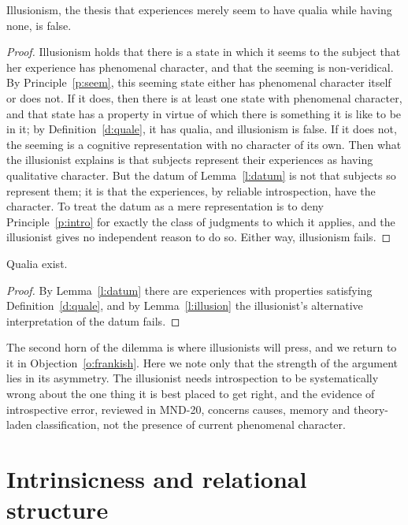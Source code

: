 \documentclass{situationist-preprint}
\begin{document}
\begin{lemma}\label{l:illusion}
Illusionism, the thesis that experiences merely seem to have qualia while having none, is false.
\end{lemma}

\begin{proof}
Illusionism holds that there is a state in which it seems to the subject that her experience has phenomenal character, and that the seeming is non-veridical. By Principle~\ref{p:seem}, this seeming state either has phenomenal character itself or does not. If it does, then there is at least one state with phenomenal character, and that state has a property in virtue of which there is something it is like to be in it; by Definition~\ref{d:quale}, it has qualia, and illusionism is false. If it does not, the seeming is a cognitive representation with no character of its own. Then what the illusionist explains is that subjects represent their experiences as having qualitative character. But the datum of Lemma~\ref{l:datum} is not that subjects so represent them; it is that the experiences, by reliable introspection, have the character. To treat the datum as a mere representation is to deny Principle~\ref{p:intro} for exactly the class of judgments to which it applies, and the illusionist gives no independent reason to do so. Either way, illusionism fails.
\end{proof}

\begin{proposition}\label{p:exist}
Qualia exist.
\end{proposition}

\begin{proof}
By Lemma~\ref{l:datum} there are experiences with properties satisfying Definition~\ref{d:quale}, and by Lemma~\ref{l:illusion} the illusionist's alternative interpretation of the datum fails.
\end{proof}

The second horn of the dilemma is where illusionists will press, and we return to it in Objection~\ref{o:frankish}. Here we note only that the strength of the argument lies in its asymmetry. The illusionist needs introspection to be systematically wrong about the one thing it is best placed to get right, and the evidence of introspective error, reviewed in MND-20, concerns causes, memory and theory-laden classification, not the presence of current phenomenal character.

\section{Intrinsicness and relational structure}
\end{document}
